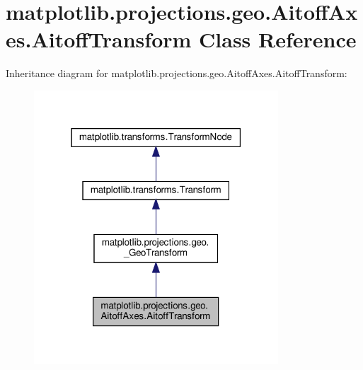 \hypertarget{classmatplotlib_1_1projections_1_1geo_1_1AitoffAxes_1_1AitoffTransform}{}\section{matplotlib.\+projections.\+geo.\+Aitoff\+Axes.\+Aitoff\+Transform Class Reference}
\label{classmatplotlib_1_1projections_1_1geo_1_1AitoffAxes_1_1AitoffTransform}


Inheritance diagram for matplotlib.\+projections.\+geo.\+Aitoff\+Axes.\+Aitoff\+Transform\+:
\nopagebreak
\begin{figure}[H]
\begin{center}
\leavevmode
\includegraphics[width=259pt]{classmatplotlib_1_1projections_1_1geo_1_1AitoffAxes_1_1AitoffTransform__inherit__graph}
\end{center}
\end{figure}



